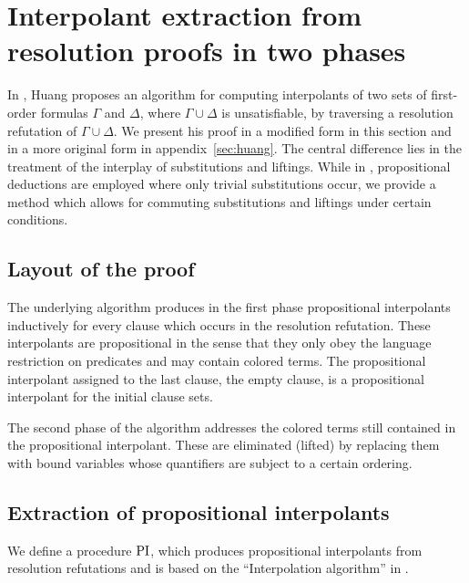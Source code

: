 \chapter{Interpolant extraction from resolution proofs in two phases}
\label{sec:two_phases}

In \cite{Huang95}, Huang proposes an algorithm for computing interpolants of two sets of first-order formulas $\Gamma$ and $\Delta$, where $\Gamma\cup\Delta$ is unsatisfiable, by traversing a resolution refutation of $\Gamma \cup \Delta$.
We present his proof in a modified form in this section and in a more original form in appendix~\ref{sec:huang}.
The central difference lies in the treatment of the interplay of substitutions and liftings. While in \cite{Huang95}, propositional deductions are employed where only trivial substitutions occur, we provide a method which allows for commuting substitutions and liftings under certain conditions.

\section{Layout of the proof}

The underlying algorithm produces in the first phase propositional interpolants inductively for every clause which occurs in the resolution refutation.
These interpolants are propositional in the sense that they only obey the language restriction on predicates and may contain colored terms.
The propositional interpolant assigned to the last clause, the empty clause, is a propositional interpolant for the initial clause sets.

The second phase of the algorithm addresses the colored terms still contained in the propositional interpolant.
These are eliminated (lifted) by replacing them with bound variables whose quantifiers are subject to a certain ordering.



\section{Extraction of propositional interpolants}

We define a procedure $\operatorname{PI}$, which produces propositional interpolants from resolution refutations and is based on the ``Interpolation algorithm'' in \cite{Huang95}.

